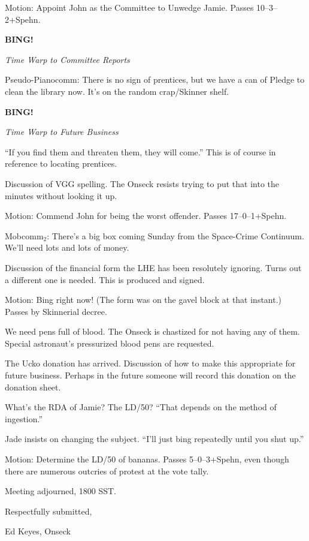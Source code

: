 \documentclass[12pt]{article}
\newcommand{\bing}{{\bf BING!} }
\newcommand{\goto}[1]{\bing \vskip 12pt \centerline{{\em{#1}}}}
\begin{document}
Motion: Appoint John as the Committee to Unwedge Jamie.  Passes
10--3--2+Spehn.

\goto{Time Warp to Committee Reports}

Pseudo-Pianocomm: There is no sign of prentices, but we have a can of
Pledge to clean the library now.  It's on the random crap/Skinner
shelf.

\goto{Time Warp to Future Business}

``If you find them and threaten them, they will come.''  This is of
course in reference to locating prentices.

Discussion of VGG spelling.  The Onseck resists trying to put that
into the minutes without looking it up.

Motion: Commend John for being the worst offender.  Passes 17--0--1+Spehn.

Mobcomm$_2$: There's a big box coming Sunday from the Space-Crime
Continuum.  We'll need lots and lots of money.

Discussion of the financial form the LHE has been resolutely ignoring.
Turns out a different one is needed.  This is produced and signed.

Motion: Bing right now!  (The form was on the gavel block at that
instant.)  Passes by Skinnerial decree.

We need pens full of blood.  The Onseck is chastized for not having
any of them.  Special astronaut's pressurized blood pens are requested.

The Ucko donation has arrived.  Discussion of how to make this
appropriate for future business.  Perhaps in the future someone will
record this donation on the donation sheet.

What's the RDA of Jamie?  The LD/50?  ``That depends on the method
of ingestion.''

Jade insists on changing the subject.  ``I'll just bing repeatedly
until you shut up.''

Motion: Determine the LD/50 of bananas.  Passes 5--0--3+Spehn, even
though there are numerous outcries of protest at the vote tally.

\vspace{12pt}

\noindent
Meeting adjourned, 1800 SST.

\vspace{18pt}

\centerline{Respectfully submitted,}
\centerline{Ed Keyes, Onseck}
\end{document}
